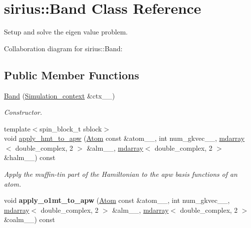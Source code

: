 \hypertarget{classsirius_1_1_band}{}\section{sirius\+:\+:Band Class Reference}
\label{classsirius_1_1_band}


Setup and solve the eigen value problem.  




Collaboration diagram for sirius\+:\+:Band\+:
\subsection*{Public Member Functions}
\begin{DoxyCompactItemize}
\item 
\hyperlink{classsirius_1_1_band_aae455fe48d72e332450a03b4e999f3ba}{Band} (\hyperlink{classsirius_1_1_simulation__context}{Simulation\+\_\+context} \&ctx\+\_\+\+\_\+)
\begin{DoxyCompactList}\small\item\em Constructor. \end{DoxyCompactList}\item 
{\footnotesize template$<$spin\+\_\+block\+\_\+t sblock$>$ }\\void \hyperlink{classsirius_1_1_band_ab39910f680e4c969a2b2bc14053b3c0a}{apply\+\_\+hmt\+\_\+to\+\_\+apw} (\hyperlink{classsirius_1_1_atom}{Atom} const \&atom\+\_\+\+\_\+, int num\+\_\+gkvec\+\_\+\+\_\+, \hyperlink{classsddk_1_1mdarray}{mdarray}$<$ double\+\_\+complex, 2 $>$ \&alm\+\_\+\+\_\+, \hyperlink{classsddk_1_1mdarray}{mdarray}$<$ double\+\_\+complex, 2 $>$ \&halm\+\_\+\+\_\+) const 
\begin{DoxyCompactList}\small\item\em Apply the muffin-\/tin part of the Hamiltonian to the apw basis functions of an atom. \end{DoxyCompactList}\item 
\hypertarget{classsirius_1_1_band_a0ed8e926aae488a73a839730265c240e}{}void {\bfseries apply\+\_\+o1mt\+\_\+to\+\_\+apw} (\hyperlink{classsirius_1_1_atom}{Atom} const \&atom\+\_\+\+\_\+, int num\+\_\+gkvec\+\_\+\+\_\+, \hyperlink{classsddk_1_1mdarray}{mdarray}$<$ double\+\_\+complex, 2 $>$ \&alm\+\_\+\+\_\+, \hyperlink{classsddk_1_1mdarray}{mdarray}$<$ double\+\_\+complex, 2 $>$ \&oalm\+\_\+\+\_\+) const \label{classsirius_1_1_band_a0ed8e926aae488a73a839730265c240e}


\end{DoxyCompactItemize}
